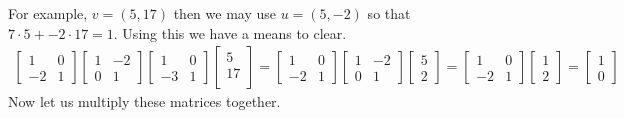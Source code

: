 \documentclass[12pt,twoside,dvipsnames,letterpaper]{memoir}
\begin{document}
For example, $v=(5,17)$ then we may use $u=(5,-2)$ 
so that $7\cdot 5+-2\cdot 17=1$.
Using this we have a means to clear.
\begin{align*}
    \begin{bmatrix}
        1 & 0 \\
        -2 & 1
    \end{bmatrix}    
    \begin{bmatrix}
        1 & -2 \\
        0 & 1
    \end{bmatrix}    
    \begin{bmatrix}
        1 & 0 \\
        -3 & 1
    \end{bmatrix}    
    \begin{bmatrix}
        5 \\
        17 \\
    \end{bmatrix}
     = 
    \begin{bmatrix}
        1 & 0 \\
        -2 & 1
    \end{bmatrix}    
    \begin{bmatrix}
        1 & -2 \\
        0 & 1
    \end{bmatrix}    
    \begin{bmatrix}
        5 \\ 2
    \end{bmatrix}
     =
    \begin{bmatrix}
        1 & 0 \\
        -2 & 1
    \end{bmatrix}    
    \begin{bmatrix}
        1 \\ 2
    \end{bmatrix}
    = \begin{bmatrix}
        1 \\ 0 
    \end{bmatrix}
\end{align*}
Now let us multiply these matrices together.
\end{document}
